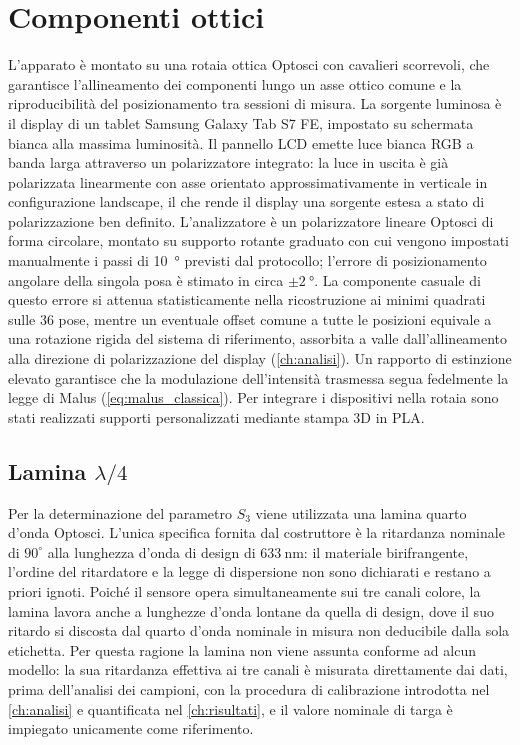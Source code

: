 \section{Componenti ottici}
\label{sec:componenti-ottici}

L'apparato è montato su una rotaia ottica Optosci con cavalieri scorrevoli, che garantisce l'allineamento dei componenti lungo un asse ottico comune e la riproducibilità del posizionamento tra sessioni di misura. La sorgente luminosa è il display di un tablet Samsung Galaxy Tab S7 FE, impostato su schermata bianca alla massima luminosità. Il pannello LCD emette luce bianca RGB a banda larga attraverso un polarizzatore integrato: la luce in uscita è già polarizzata linearmente con asse orientato approssimativamente in verticale in configurazione landscape, il che rende il display una sorgente estesa a stato di polarizzazione ben definito. L'analizzatore è un polarizzatore lineare Optosci di forma circolare, montato su supporto rotante graduato con cui vengono impostati manualmente i passi di \SI{10}{\degree} previsti dal protocollo; l'errore di posizionamento angolare della singola posa è stimato in circa $\pm\SI{2}{\degree}$. La componente casuale di questo errore si attenua statisticamente nella ricostruzione ai minimi quadrati sulle 36 pose, mentre un eventuale offset comune a tutte le posizioni equivale a una rotazione rigida del sistema di riferimento, assorbita a valle dall'allineamento alla direzione di polarizzazione del display (\cref{ch:analisi}). Un rapporto di estinzione elevato garantisce che la modulazione dell'intensità trasmessa segua fedelmente la legge di Malus (\cref{eq:malus_classica}). Per integrare i dispositivi nella rotaia sono stati realizzati supporti personalizzati mediante stampa 3D in PLA.

\subsection{Lamina \texorpdfstring{$\lambda/4$}{lambda/4}}
\label{subsec:lamina-qwp}

Per la determinazione del parametro $S_3$ viene utilizzata una lamina quarto d'onda Optosci. L'unica specifica fornita dal costruttore è la ritardanza nominale di $90^\circ$ alla lunghezza d'onda di design di $\SI{633}{\nano\meter}$: il materiale birifrangente, l'ordine del ritardatore e la legge di dispersione non sono dichiarati e restano a priori ignoti. Poiché il sensore opera simultaneamente sui tre canali colore, la lamina lavora anche a lunghezze d'onda lontane da quella di design, dove il suo ritardo si discosta dal quarto d'onda nominale in misura non deducibile dalla sola etichetta. Per questa ragione la lamina non viene assunta conforme ad alcun modello: la sua ritardanza effettiva ai tre canali è misurata direttamente dai dati, prima dell'analisi dei campioni, con la procedura di calibrazione introdotta nel \cref{ch:analisi} e quantificata nel \cref{ch:risultati}, e il valore nominale di targa è impiegato unicamente come riferimento.


